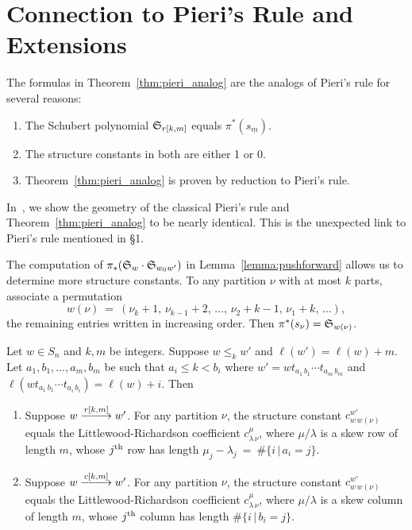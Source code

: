 \section{Connection to Pieri's Rule and Extensions}

The formulas in Theorem~\ref{thm:pieri_analog} are the analogs of Pieri's rule
for several reasons:
\begin{enumerate}
\item The Schubert polynomial ${\frak S}_{r[k,m]}$ 
equals  $\pi^*(s_{\underline{m}})$.
\item The structure constants in both are either 1 or 0.
\item Theorem~\ref{thm:pieri_analog} is proven by reduction to 
Pieri's rule.
\end{enumerate}
In~\cite{sottile_Pieri_flag}, we show the geometry of
the classical Pieri's rule and Theorem~\ref{thm:pieri_analog} to be 
nearly identical.   This is the unexpected link to Pieri's rule
mentioned in \S 1.
\medskip


The computation of $\pi_*({\frak S}_w \cdot{\frak S}_{w_0w'})$
in Lemma~\ref{lemma:pushforward} allows us to determine 
more structure constants.
To any partition $\nu$ with at most $k$ parts, associate
a permutation 
$$
w(\nu)\  = \ 
(\nu_k+1,\,\nu_{k-1}+2,\,\ldots,\,\nu_2+k-1,\,\nu_1+k,\,\ldots),
$$
the remaining entries written in increasing order.
Then $\pi^*(s_{\nu}) = {\frak S}_{w(\nu)}$.

\begin{thm} Let $w\in S_n$ and $k,m$ be integers. 
Suppose  $w\leq_k w'$ and $\ell(w') = \ell(w) +m$.
Let $a_1,b_1,\ldots,a_m,b_m$ be such that 
$a_i\leq k <b_i$ where $w' = w t_{a_1\,b_1}\cdots t_{a_m\,b_m}$ 
and $\ell(w t_{a_1\,b_1}\cdots t_{a_i\,b_i}) = \ell(w) +i$.
Then
\begin{enumerate}
\item  Suppose $w\rkm w'$.
For any partition
$\nu$, the structure constant $c^{w'}_{w\, w(\nu)}$
equals the Littlewood-Richardson coefficient
$c^\mu_{\lambda\,\nu}$, where $\mu/\lambda$ is a skew row of length
$m$, whose $j^{\mbox{\scriptsize th}}$ row has length 
$\mu_j - \lambda_j \ = \ \#\{i \,|\, a_i = j\}$.
\item
 Suppose $w\ckm w'$.
For any partition
$\nu$, the structure constant $c^{w'}_{w\, w(\nu)}$
equals the Littlewood-Richardson coefficient
$c^\mu_{\lambda\,\nu}$, where $\mu/\lambda$ is a skew column of length
$m$, whose $j^{\mbox{\scriptsize th}}$ column has length
$\#\{i \,|\, b_i=j\}$.
\end{enumerate}
\end{thm}

